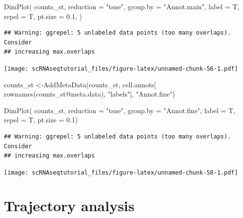 \documentclass[
  openany]{book}
\newenvironment{Shaded}{\begin{snugshade}}{\end{snugshade}}
\newcommand{\AttributeTok}[1]{\textcolor[rgb]{0.77,0.63,0.00}{#1}}
\newcommand{\FloatTok}[1]{\textcolor[rgb]{0.00,0.00,0.81}{#1}}
\newcommand{\FunctionTok}[1]{\textcolor[rgb]{0.00,0.00,0.00}{#1}}
\newcommand{\NormalTok}[1]{#1}
\newcommand{\OtherTok}[1]{\textcolor[rgb]{0.56,0.35,0.01}{#1}}
\newcommand{\SpecialCharTok}[1]{\textcolor[rgb]{0.00,0.00,0.00}{#1}}
\newcommand{\StringTok}[1]{\textcolor[rgb]{0.31,0.60,0.02}{#1}}
\begin{document}
\begin{Shaded}
\begin{Highlighting}[]
\FunctionTok{DimPlot}\NormalTok{(}
\NormalTok{    counts\_st,}
    \AttributeTok{reduction =} \StringTok{"tsne"}\NormalTok{,}
    \AttributeTok{group.by =} \StringTok{"Annot.main"}\NormalTok{,}
    \AttributeTok{label =}\NormalTok{ T,}
    \AttributeTok{repel =}\NormalTok{ T,}
    \AttributeTok{pt.size =} \FloatTok{0.1}\NormalTok{,}
\NormalTok{  )}
\end{Highlighting}
\end{Shaded}

\begin{verbatim}
## Warning: ggrepel: 5 unlabeled data points (too many overlaps). Consider
## increasing max.overlaps
\end{verbatim}

\texttt{[image: scRNAseqtutorial\_files/figure-latex/unnamed-chunk-56-1.pdf]}

\begin{Shaded}
\begin{Highlighting}[]
\NormalTok{counts\_st }\OtherTok{\textless{}{-}}\FunctionTok{AddMetaData}\NormalTok{(counts\_st, cell.annots[}
  \FunctionTok{rownames}\NormalTok{(counts\_st}\SpecialCharTok{@}\NormalTok{meta.data), }\StringTok{"labels"}\NormalTok{], }\StringTok{"Annot.fine"}\NormalTok{)}
\end{Highlighting}
\end{Shaded}

\begin{Shaded}
\begin{Highlighting}[]
\FunctionTok{DimPlot}\NormalTok{(}
\NormalTok{    counts\_st,}
    \AttributeTok{reduction =} \StringTok{"tsne"}\NormalTok{,}
    \AttributeTok{group.by =} \StringTok{"Annot.fine"}\NormalTok{,}
    \AttributeTok{label =}\NormalTok{ T,}
    \AttributeTok{repel =}\NormalTok{ T,}
    \AttributeTok{pt.size =} \FloatTok{0.1}\NormalTok{)}
\end{Highlighting}
\end{Shaded}

\begin{verbatim}
## Warning: ggrepel: 5 unlabeled data points (too many overlaps). Consider
## increasing max.overlaps
\end{verbatim}

\texttt{[image: scRNAseqtutorial\_files/figure-latex/unnamed-chunk-58-1.pdf]}

\hypertarget{trajectory-analysis}{%
\section{Trajectory analysis}\label{trajectory-analysis}}
\end{document}
